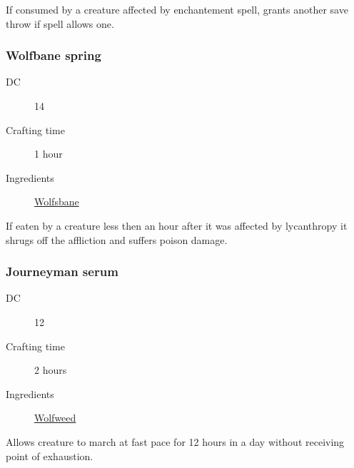 If consumed by a creature affected by enchantement spell, grants another save throw if spell allows one.

\subsubsection{Wolfbane spring}
\label{Wolfbane spring}

\begin{description}
\item [DC] 14
\item [Crafting time] 1 hour
\item [Ingredients] \hyperref[Wolfsbane]{Wolfsbane}
\end{description}

If eaten by a creature less then an hour after it was affected by lycanthropy it shrugs off 
the affliction and suffers  poison damage.

\subsubsection{Journeyman serum}

\begin{description}
\item [DC] 12
\item [Crafting time] 2 hours
\item [Ingredients] \hyperref[Wolfweed]{Wolfweed}
\end{description}

Allows creature to march at fast pace for 12 hours in a day without receiving point of exhaustion.
